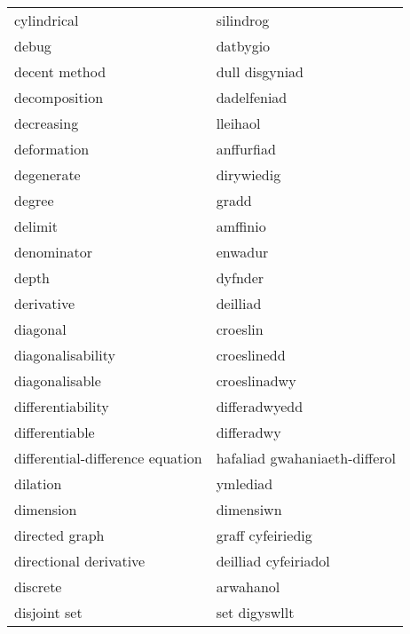 \begin{supertabular}{p{0.22\textwidth}p{0.22\textwidth}}
                     cylindrical &                       silindrog \\
                           debug &                        datbygio \\
                   decent method &                  dull disgyniad \\
                   decomposition &                     dadelfeniad \\
                      decreasing &                        lleihaol \\
                     deformation &                      anffurfiad \\
                      degenerate &                      dirywiedig \\
                          degree &                           gradd \\
                         delimit &                        amffinio \\
                     denominator &                         enwadur \\
                           depth &                         dyfnder \\
                      derivative &                        deilliad \\
                        diagonal &                        croeslin \\
               diagonalisability &                     croeslinedd \\
                  diagonalisable &                    croeslinadwy \\
               differentiability &                   differadwyedd \\
                  differentiable &                      differadwy \\
differential-difference equation &   hafaliad gwahaniaeth-differol \\
                        dilation &                        ymlediad \\
                       dimension &                       dimensiwn \\
                  directed graph &               graff cyfeiriedig \\
          directional derivative &            deilliad cyfeiriadol \\
                        discrete &                       arwahanol \\
                    disjoint set &                   set digyswllt \\

\end{supertabular}
